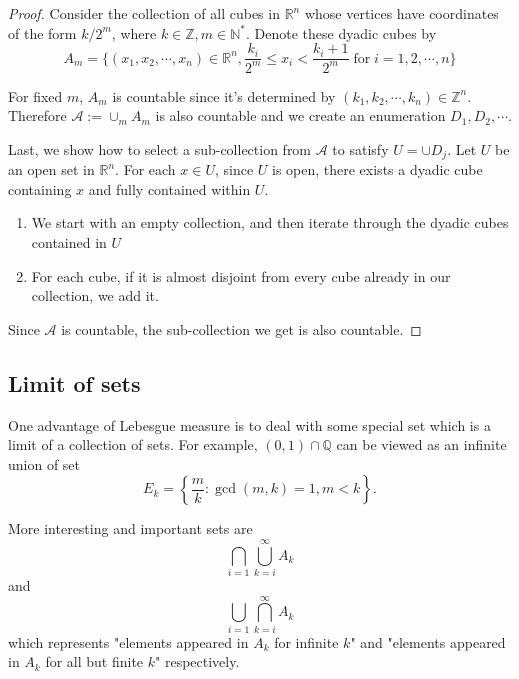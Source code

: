 \documentclass{article}
\numberwithin{equation}{section}
\begin{document}
\begin{proof}
Consider the collection of all cubes in $\mathbb{R}^n$ whose vertices have coordinates of the form $k/2^m$, where $k\in\mathbb{Z}, m\in\mathbb{N}^{*}$. Denote these dyadic cubes by 
$$
A_{m}= \{(x_1, x_2, \cdots, x_{n})\in\mathbb{R}^{n}, \frac{k_i}{2^m}\leq x_{i} <\frac{k_i+1}{2^{m}}\;\text{for}\; i=1,2,\cdots, n\}
$$ 

For fixed $m$, $A_{m}$ is countable since it's determined by $(k_1, k_2,\cdots, k_{n})\in\mathbb{Z}^{n}$. Therefore $\mathcal{A}:=\cup_{m} A_{m}$ is also countable and we create an enumeration $D_{1}, D_{2},\cdots$. 

Last, we show how to select a sub-collection from $\mathcal{A}$ to satisfy $U = \cup D_{j}$. 
Let $U$ be an open set in $\mathbb{R}^n$. For each $x \in U$, since $U$ is open, there exists a dyadic cube containing $x$ and fully contained within $U$.

\begin{enumerate}
    \item We start with an empty collection, and then iterate through the dyadic cubes contained in $U$

    \item For each cube, if it is almost disjoint from every cube already in our collection, we add it.
    \begin{center}
    
    \end{center}
\end{enumerate}
Since $\mathcal{A}$ is countable, the sub-collection we get is also countable.
\end{proof}

\subsection{Limit of sets}

One advantage of Lebesgue measure is to deal with some special set which is a limit of a collection of sets. For example,
$(0,1) \cap \mathbb{Q}$ can be viewed as an infinite union of set
$$
E_{k} = \left\{\frac{m}{k}: \operatorname{gcd}(m,k)=1, m<k \right\}.
$$

More interesting and important sets are
$$
\bigcap_{i=1} \bigcup_{k=i}^{\infty} A_{k}
$$
and
\begin{equation}
\label{basic_set2}
    \bigcup_{i=1} \bigcap_{k=i}^{\infty} A_{k}
\end{equation}
which represents "elements appeared in $A_{k}$ for infinite $k$" and "elements appeared in $A_{k}$ for all but finite $k$" respectively.
\end{document}
